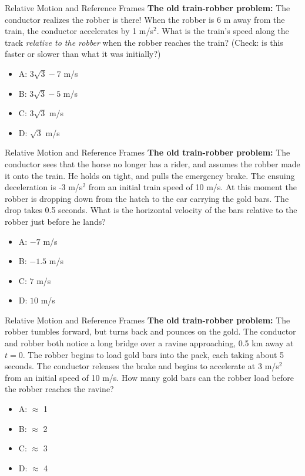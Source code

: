 \documentclass{beamer}
\begin{document}
\begin{frame}{Relative Motion and Reference Frames}
\small 
\textbf{The old train-robber problem:} The conductor realizes the robber is there!  When the robber is 6 m away from the train, the conductor accelerates by 1 m/s$^2$.  What is the train's speed along the track \textit{relative to the robber} when the robber reaches the train? (Check: is this faster or slower than what it was initially?)\\
\begin{itemize}
\item A: $3\sqrt{3}-7$ m/s
\item B: $3\sqrt{3}-5$ m/s
\item C: $3\sqrt{3}$  m/s
\item D: $\sqrt{3}$  m/s
\end{itemize}
\end{frame}

\begin{frame}{Relative Motion and Reference Frames}
\small 
\textbf{The old train-robber problem:} The conductor sees that the horse no longer has a rider, and assumes the robber made it onto the train.  He holds on tight, and pulls the emergency brake.  The ensuing deceleration is -3 m/s$^2$ from an initial train speed of 10 m/s.  At this moment the robber is dropping down from the hatch to the car carrying the gold bars.  The drop takes 0.5 seconds.  What is the horizontal velocity of the bars relative to the robber just before he lands?\\
\begin{itemize}
\item A: $-7$ m/s
\item B: $-1.5$ m/s
\item C: $7$  m/s
\item D: $10$  m/s
\end{itemize}
\end{frame}

\begin{frame}{Relative Motion and Reference Frames}
\small 
\textbf{The old train-robber problem:} The robber tumbles forward, but turns back and pounces on the gold.  The conductor and robber both notice a long bridge over a ravine approaching, 0.5 km away at $t=0$.  The robber begins to load gold bars into the pack, each taking about 5 seconds.  The conductor releases the brake and begins to accelerate at 3 m/s$^2$ from an initial speed of 10 m/s.  How many gold bars can the robber load before the robber reaches the ravine?\\
\begin{itemize}
\item A: $\approx$ 1
\item B: $\approx$ 2
\item C: $\approx$ 3
\item D: $\approx$ 4
\end{itemize}
\end{frame}
\end{document}
